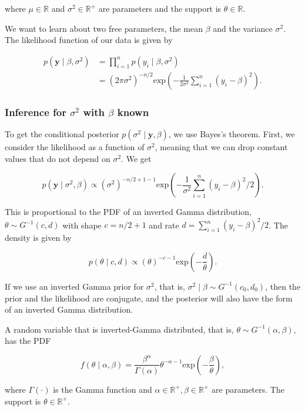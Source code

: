 where $\mu\in\mathbb{R}$ and $\sigma^2\in\mathbb{R}^{+}$ are parameters and the support is $\theta\in\mathbb{R}$. 

We want to learn about two free parameters, the mean $\beta$ and the variance $\sigma^2$. The likelihood function of our data is given by

\begin{align*}
	p(\bm{y}\mid\beta,\sigma^2) &= \prod^n_{i=1}p(y_i \mid \beta,\sigma^2) \\
	&= (2\pi\sigma^2)^{-n/2}\mathrm{exp}\left(-\frac{1}{2\sigma^2}\sum^n_{i=1}(y_i-\beta)^2\right).
\end{align*}

\subsubsection{Inference for $\sigma^2$ with $\beta$ known}

To get the conditional posterior $p(\sigma^2\mid\bm{y},\beta)$, we use Bayes's theorem. First, we consider the likelihood as a function of $\sigma^2$, meaning that we can drop constant values that do not depend on $\sigma^2$. We get

\[
	p(\bm{y}\mid\sigma^2,\beta) \propto (\sigma^2)^{-n/2+1-1}\mathrm{exp}\left(-\frac{1}{\sigma^2}\sum^n_{i=1}(y_i-\beta)^2/2\right).
\]

This is proportional to the PDF of an inverted Gamma distribution, $\theta\sim G^{-1}(c,d)$ with shape $c = n/2 + 1$ and rate $d = \sum^n_{i=1}(y_i-\beta)^2/2$. The density is given by

\[
	p(\theta\mid c,d) \propto (\theta)^{-c-1}\mathrm{exp}\left(-\frac{d}{\theta}\right).
\]

If we use an inverted Gamma prior for $\sigma^2$, that is, $\sigma^2\mid\beta \sim G^{-1}(c_0,d_0)$, then the prior and the likelihood are conjugate, and the posterior will also have the form of an inverted Gamma distribution. 

A random variable that is inverted-Gamma distributed, that is, $\theta\sim G^{-1}(\alpha,\beta)$, has the PDF

\begin{equation}
	f(\theta\mid\alpha,\beta) = \frac{\beta^\alpha}{\Gamma(\alpha)}\theta^{-\alpha-1}\mathrm{exp}\left(-\frac{\beta}{\theta}\right),
\end{equation}

where $\Gamma(\cdot)$ is the Gamma function and $\alpha\in\mathbb{R}^{+}, \beta\in\mathbb{R}^{+}$ are parameters. The support is $\theta\in\mathbb{R}^{+}$. 

